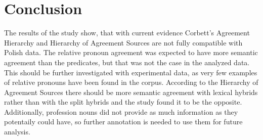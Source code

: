 \chapter*{Conclusion}\label{chap:Conclusion}

The results of the study show, that with current evidence Corbett's Agreement Hierarchy and Hierarchy of Agreement Sources are not fully compatible with Polish data. The relative pronoun agreement was expected to have more semantic agreement than the predicates, but that was not the case in the analyzed data. This should be further investigated with experimental data, as very few examples of relative pronouns have been found in the corpus. According to the Hierarchy of Agreement Sources there should be more semantic agreement with lexical hybrids rather than with the split hybrids and the study found it to be the opposite. Additionally, profession nouns did not provide as much information as they potentaily could have, so further annotation is needed to use them for future analysis.
